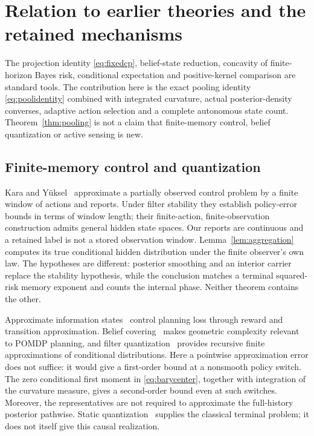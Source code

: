 \section{Relation to earlier theories and the retained mechanisms}\label{sec:comparison}
The projection identity \eqref{eq:fixedcp}, belief-state reduction, concavity of finite-horizon Bayes risk, conditional expectation and positive-kernel comparison are standard tools. The contribution here is the exact pooling identity \eqref{eq:poolidentity} combined with integrated curvature, actual posterior-density converses, adaptive action selection and a complete autonomous state count. Theorem~\ref{thm:pooling} is not a claim that finite-memory control, belief quantization or active sensing is new.

\subsection{Finite-memory control and quantization}
Kara and Y\"uksel~\cite{kara} approximate a partially observed control problem by a finite window of actions and reports. Under filter stability they establish policy-error bounds in terms of window length; their finite-action, finite-observation construction admits general hidden state spaces. Our reports are continuous and a retained label is not a stored observation window. Lemma~\ref{lem:aggregation} computes its true conditional hidden distribution under the finite observer's own law. The hypotheses are different: posterior smoothing and an interior carrier replace the stability hypothesis, while the conclusion matches a terminal squared-risk memory exponent and counts the internal phase. Neither theorem contains the other.

Approximate information states~\cite{ais} control planning loss through reward and transition approximation. Belief covering~\cite{zhang} makes geometric complexity relevant to POMDP planning, and filter quantization~\cite{pages} provides recursive finite approximations of conditional distributions. Here a pointwise approximation error does not suffice: it would give a first-order bound at a nonsmooth policy switch. The zero conditional first moment in \eqref{eq:barycenter}, together with integration of the curvature measure, gives a second-order bound even at such switches. Moreover, the representatives are not required to approximate the full-history posterior pathwise. Static quantization~\cite{graf} supplies the classical terminal problem; it does not itself give this causal realization.

